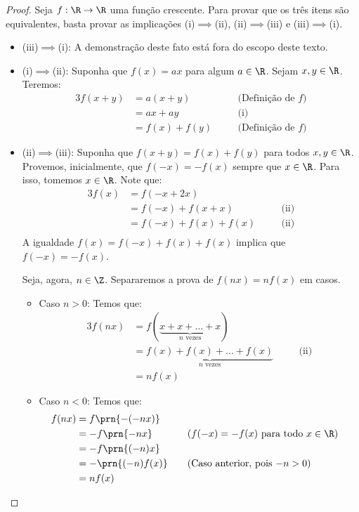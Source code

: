 \begin{proof}
  Seja $f:\R \to \R$ uma função crescente.
  Para provar que os três itens são equivalentes, basta provar as implicações (i)$\implies$(ii),  
  (ii)$\implies$(iii) e (iii)$\implies$(i).

  \begin{itemize}
    \item (iii)$\implies$(i): A demonstração deste fato está fora do escopo deste texto.
    \item (i)$\implies$(ii): Suponha que $f(x)=ax$ para algum $a \in \R$. Sejam $x,y\in\R$.
    Teremos:
    \begin{alignat*}{3}
        f(x+y) &= a(x+y) && \quad\text{(Definição de $f$)}\\
        &= ax+ay && \quad\text{(i)}\\
        &= f(x)+f(y) && \quad\text{(Definição de $f$)}
    \end{alignat*}

    \item (ii)$\implies$(iii): Suponha que $f(x+y)=f(x)+f(y)$ para todos $x,y\in\R$.
    Provemos, inicialmente, que $f(-x) = -f(x)$ sempre que $x\in\R$. 
    Para isso, tomemos $x\in\R$.
    Note que:
    \begin{alignat*}{3}
      f(x) &= f(-x+2x)\\
      &= f(-x)+f(x+x) && \quad\text{(ii)}\\
      &= f(-x)+f(x)+f(x) && \quad\text{(ii)}\\
    \end{alignat*}
    A igualdade $f(x) = f(-x)+f(x)+f(x)$ implica que $f(-x) = -f(x)$.

    Seja, agora, $n\in\Z$. Separaremos a prova de $f(nx)=nf(x)$ em casos.
    \begin{itemize}
      \item Caso $n>0$: Temos que:
      \begin{alignat*}{3}
        f(nx) &= f(\underbrace{x+x+\dots+x}_{\text{$n$ vezes}}) \\
        &= \underbrace{f(x)+f(x)+\dots+f(x)}_{\text{$n$ vezes}} && \quad\text{(ii)}\\
        &= nf(x)
      \end{alignat*}

      \item Caso $n<0$: Temos que:
      \begin{alignat*}{3}
        f(nx)&=f\prn{-(-nx)} \\
        &= -f\prn{-nx} && \quad\text{($f(-x) = -f(x)$ para todo $x \in \R$)}\\
        &= -f\prn{(-n)x} \\
        &= -\prn{ (-n)f(x)} && \quad\text{(Caso anterior, pois $-n>0$)}\\
        &= nf(x)
      \end{alignat*}
      

\end{itemize}
\end{itemize}
\end{proof}

